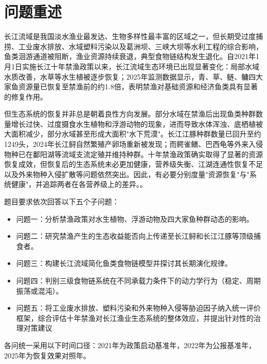 \section{问题重述}
长江流域是我国淡水渔业最发达、生物多样性最丰富的区域之一，但长期受过度捕捞、工业废水排放、水域塑料污染以及葛洲坝、三峡大坝等水利工程的综合影响，鱼类洄游通道被阻断，渔业资源持续衰退，典型食物链结构发生退化。自2021年1月1日实施长江十年禁渔政策以来，长江流域生态环境已出现显著变化：局部水域水质改善，水草等水生植被逐步恢复；2025年监测数据显示，青、草、鲢、鳙四大家鱼资源量已恢复至禁渔前的约1.8倍，表明禁渔对基础资源和经济鱼类具有显著的修复作用。

但生态系统的恢复并非总是朝着良性方向发展。部分水域在禁渔后出现鱼类种群数量增长过快、过度摄食水生植物和浮游动物的现象，进而导致水体浑浊、底栖植被大面积减少，部分水域甚至形成大面积"水下荒漠"。长江江豚种群数量已回升至约1249头，2024年长江鲟自然繁殖产卵场重新被发现；而鳄雀鳝、巴西龟等外来入侵物种已在鄱阳湖等流域支流定殖并维持种群。十年禁渔政策确实取得了显著的资源恢复成效，但恢复后的生态系统未必更加健康，营养级失衡、江湖连通性恢复不足以及外来物种入侵扩散等问题依然突出。因此，有必要分别度量"资源恢复"与"系统健康"，并追踪两者在各营养级上的差异。\cite{report2022,report2023}。

题目要求依次回答以下五个子问题：
\begin{itemize}
\item 问题一：分析禁渔政策对水生植物、浮游动物及四大家鱼种群动态的影响。
\item 问题二：研究禁渔产生的生态收益能否向上传递至长江鲟和长江江豚等顶级捕食者。
\item 问题三：构建长江流域简化鱼类食物链模型并探讨其长期演化规律。
\item 问题四：判别三级食物链系统在不同承载力条件下的动力学行为（稳定、周期振荡或混沌）。
\item 问题五：将工业废水排放、塑料污染和外来物种入侵等胁迫因子纳入统一评价框架，综合评估十年禁渔对长江渔业生态系统的整体效应，并提出针对性的治理对策建议
\end{itemize}
各问统一采用以下时间口径：2021年为政策启动基准年，2022年为公报基准年，2025年为恢复效果对照年\cite{yangtzeA}。

